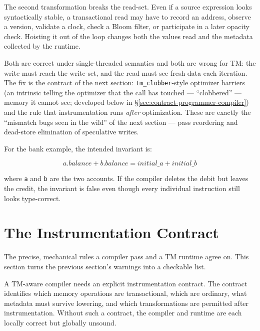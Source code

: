 The second transformation breaks the read-set. Even if a source expression looks syntactically stable, a transactional read may have to record an address, observe a version, validate a clock, check a Bloom filter, or participate in a later opacity check. Hoisting it out of the loop changes both the values read and the metadata collected by the runtime.

Both are correct under single-threaded semantics and both are wrong for TM: the write must reach the write-set, and the read must see fresh data each iteration. The fix is the contract of the next section: \texttt{tm\_clobber}-style optimizer barriers (an intrinsic telling the optimizer that the call has touched --- ``clobbered'' --- memory it cannot see; developed below in \S\ref{sec:contract-programmer-compiler}) and the rule that instrumentation runs \emph{after} optimization. These are exactly the ``mismatch bugs seen in the wild'' of the next section --- pass reordering and dead-store elimination of speculative writes.

For the bank example, the intended invariant is:

$$
a.balance + b.balance = initial\_a + initial\_b
$$

where \texttt{a} and \texttt{b} are the two accounts. If the compiler deletes the debit but leaves the credit, the invariant is false even though every individual instruction still looks type-correct.

\section{The Instrumentation Contract}
\label{sec:instrumentation-contract}

The precise, mechanical rules a compiler pass and a TM runtime agree on.
This section turns the previous section's warnings into a checkable list.

A TM-aware compiler needs an explicit instrumentation contract. The contract identifies which memory operations are transactional, which are ordinary, what metadata must survive lowering, and which transformations are permitted after instrumentation. Without such a contract, the compiler and runtime are each locally correct but globally unsound.


